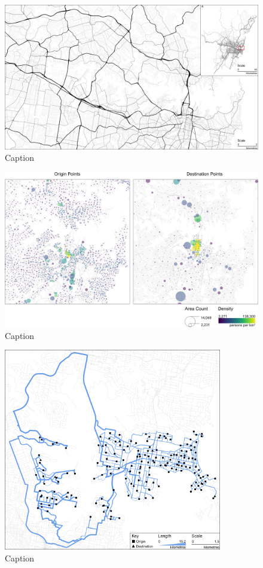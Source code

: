 \begin{figure}[!ht]
    \centering
    \includegraphics[width=1\textwidth]{body/figures/road.png}
    \caption{Caption}
    \label{fig:my_label}
\end{figure}


\begin{figure}[!ht]
    \centering
    \includegraphics[width=1\textwidth]{body/figures/od_points.png}
    \caption{Caption}
    \label{fig:my_label}
\end{figure}

\begin{figure}[!ht]
    \centering
    \includegraphics[width=0.85\textwidth]{body/figures/OD1.png}
    \caption{Caption}
    \label{fig:my_label}
\end{figure}


